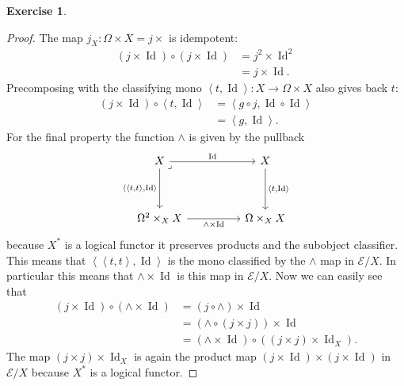 \documentclass{article}
\DeclareMathOperator{\Id}{Id}
\newcommand{\topos}{\mathcal{E}}
\newcommand{\gen}[1]{\left<#1\right>}
\theoremstyle{definition}
\newtheorem{question}{Exercise}
\begin{document}
\begin{question}
\begin{enumerate}[(a)]
              \begin{proof}
                  The map \(j_{X}:\Omega\times X=j\times\)
                  is idempotent:
                  \begin{align*}
                      (j\times\Id)\circ(j\times\Id) & =j^{2}\times\Id^{2} \\
                                                    & =j\times\Id.
                  \end{align*}
                  Precomposing with the classifying mono
                  \(\gen{t,\Id}:X\to\Omega\times X\) also gives back \(t\):
                  \begin{align*}
                      (j\times\Id)\circ\gen{t,\Id} & =\gen{g\circ j,\Id\circ\Id} \\
                                                   & =\gen{g,\Id}.
                  \end{align*}
                  For the final property the function \(\wedge\) is given by the
                  pullback
                  \[
                      \begin{tikzcd}[ampersand replacement=\&]
                          X \&\& X \\
                          \\
                          {\Omega^{2}\times_{X}X} \&\& {\Omega\times_{X}X}
                          \arrow["\Id", from=1-1, to=1-3]
                          \arrow["{\gen{\gen{t,t},\Id}}"', from=1-1, to=3-1]
                          \arrow["\wedge\times\Id"', from=3-1, to=3-3]
                          \arrow["{\gen{t,\Id}}", from=1-3, to=3-3]
                          \arrow["\lrcorner"{anchor=center, pos=0}, draw=none, from=1-1, to=3-3]
                      \end{tikzcd}
                  \]
                  because \(X^{*}\) is a logical functor it preserves products
                  and the subobject classifier. This means that
                  \(\gen{\gen{t,t},\Id}\) is the mono classified by the
                  \(\wedge\) map in \(\topos/X\). In particular this means that
                  \(\wedge\times\Id\) is this map in \(\topos/X\). Now we can
                  easily see that
                  \begin{align*}
                      (j\times\Id)\circ(\wedge\times\Id) & =(j\circ\wedge)\times\Id                           \\
                                                         & =(\wedge\circ(j\times j))\times\Id                 \\
                                                         & =(\wedge\times\Id)\circ((j\times j)\times\Id_{X}).
                  \end{align*}
                  The map \((j\times j)\times\Id_{X}\) is again the product map
                  \((j\times\Id)\times(j\times\Id)\) in \(\topos/X\) because
                  \(X^{*}\) is a logical functor.


\end{proof}
\end{enumerate}
\end{question}
\end{document}
